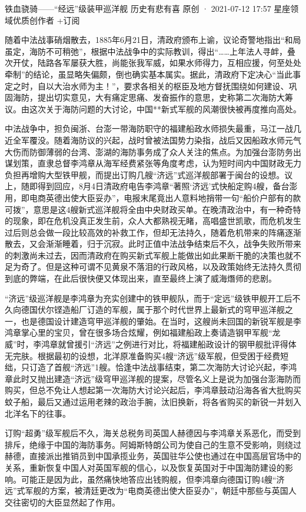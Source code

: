 \documentclass[12pt,UTF8]{ctexbook}
\begin{document}
铁血骁骑——“经远”级装甲巡洋舰
历史有悲有喜
原创 ·  2021-07-12 17:57
星座领域优质创作者
+订阅

随着中法战事硝烟散去，1885年6月21日，清政府颁布上谕，议论奇警地指出“和局虽定，海防不可稍弛”，根据中法战争中的实际教训，得出“……上年法人寻衅，叠次开仗，陆路各军屡获大胜，尚能张我军威，如果水师得力，互相应援，何至处处牵制”的结论，虽显略失偏颇，倒也确实基本属实。据此，清政府下定决心“当此事定之时，自以大治水师为主！”，要求各相关的枢臣及地方督抚围绕如何建设、巩固海防，提出切实意见，大有痛定思痛、发奋振作的意思，史称第二次海防大筹议。由这次关于海防问题的大讨论，中国**新式军舰的风潮很快被再度推向高处。

中法战争中，担负闽浙、台澎一带海防职守的福建船政水师损失最重，马江一战几近全军覆没。随着海防议的兴起，战时曾被法国势力染指，战后又因船政水师元气大伤而防御薄弱的台湾、澎湖的海防事务成了众人关注的焦点。为加强台澎防务出谋划策，直隶总督李鸿章从海军经费紧张等角度考虑，认为短时间内中国财政无力负担再增购大型铁甲舰，而提出订购几艘“济远”式巡洋舰部署于闽台的设想。议上，随即得到回应，8月4日清政府电告李鸿章“著照‘济远’式快船定购4艘，备台澎用，即电商英德出使大臣妥办”，电报末尾竟出人意料地捎带一句“船价户部有的款可拨”，意思是这4艘新式巡洋舰将全由中央财政买单。在晚清政治中，有一种奇特的现象，即在危机没真正发生前，众人大都熟视无睹，高唱盛世凯歌，而危机发生过后则总会做一段比较高效的补救工作，但却无法持久，随着危机带来的阵痛逐渐散去，又会渐渐睡着，归于沉寂。此时正值中法战争结束后不久，战争失败所带来的刺激尚未过去，因而清政府在购买新式军舰上能做出如此果断干脆的决策也就不足为奇了。但是这种可谓不见黄泉不落泪的行政风格，以及政策始终无法持久贯彻到底的弊端，在此后很快便又体现出来，直至最终上演了威海熸师的悲剧。

“济远”级巡洋舰是李鸿章为充实创建中的铁甲舰队，而于“定远”级铁甲舰开工后不久向德国伏尔铿造船厂订造的军舰，属于那个时代世界上最新式的穹甲巡洋舰之一，也是德国设计建造穹甲巡洋舰的肇始。在当时，这艘尚未回国的新锐军舰是李鸿章掌心里的宝贝，曾在很多场合炫耀，例如福建船政上奏请造钢甲军舰“龙威”时，李鸿章就曾援引“济远”之例进行对比，将福建船政设计的钢甲舰批评得体无完肤。根据最初的设想，北洋原准备购买4艘“济远”级军舰，但受困于经费短绌，只订造了首舰“济远”1艘。恰逢中法战事结束，第二次海防大讨论兴起，李鸿章此时又抛出建造“济远”级穹甲巡洋舰的提案，尽管名义上是说为加强台澎海防而购买，但总不免让人想起第一次海防大讨论兴起后，李鸿章鼓动沿海各省大批购买蚊子船，最后又通过运用老辣的政治手腕，汰旧换新，将各省购买的新锐一并划入北洋名下的往事。

订购“超勇”级军舰后不久，海关总税务司英国人赫德因与李鸿章关系恶化，而受到排斥，绝缘于中国的海防事务。阿姆斯特朗公司为使自己的生意不受影响，则绕过赫德，直接派出推销员到中国承揽业务，英国驻华公使也通过在中国高层官场中的关系，重新恢复中国人对英国军舰的信心，以及恢复英国对于中国海防建设的影响。可能正是因为此，虽然痛快地答应出钱购舰，但李鸿章向德国订购4艘“济远”式军舰的方案，被清廷更改为“电商英德出使大臣妥办”，朝廷中那些与英国人交往密切的大臣显然起了作用。
\end{document}
